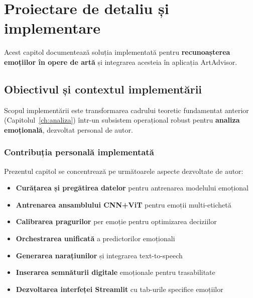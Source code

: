 \chapter{Proiectare de detaliu și implementare}
\label{ch:design_impl}


Acest capitol documentează soluția implementată pentru \textbf{recunoașterea emoțiilor în opere de artă} și integrarea acesteia în aplicația ArtAdvisor. 

\section*{Obiectivul și contextul implementării}
Scopul implementării este transformarea cadrului teoretic fundamentat anterior (Capitolul~\ref{ch:analiza}) într-un subsistem operațional robust pentru \textbf{analiza emoțională}, dezvoltat personal de autor.

\subsection*{Contribuția personală implementată}
Prezentul capitol se concentrează pe următoarele aspecte dezvoltate de autor:
\begin{itemize}
    \item \textbf{Curățarea și pregătirea datelor} pentru antrenarea modelului emoțional
    \item \textbf{Antrenarea ansamblului CNN+ViT} pentru emoții multi-etichetă
    \item \textbf{Calibrarea pragurilor} per emoție pentru optimizarea deciziilor
    \item \textbf{Orchestrarea unificată} a predictorilor emoționali
    \item \textbf{Generarea narațiunilor} și integrarea text-to-speech
    \item \textbf{Inserarea semnăturii digitale} emoționale pentru trasabilitate
    \item \textbf{Dezvoltarea interfeței Streamlit} cu tab-urile specifice emoțiilor
\end{itemize}

